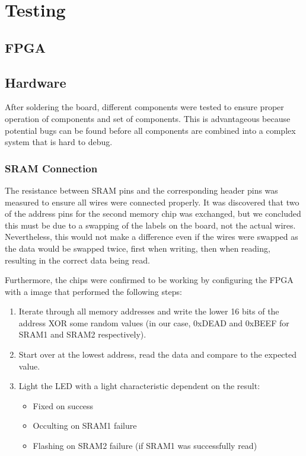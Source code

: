 \section{Testing}


\subsection{FPGA}


\subsection{Hardware}
After soldering the board, different components were tested to ensure proper operation of components and set of components.
This is advantageous because potential bugs can be found before all components are combined into a complex system that is hard to debug.

\subsubsection{SRAM Connection}
The resistance between SRAM pins and the corresponding header pins was measured to ensure all wires were connected properly.
It was discovered that two of the address pins for the second memory chip was exchanged, but we concluded this must be due to a swapping of the labels on the board, not the actual wires.
Nevertheless, this would not make a difference even if the wires were swapped as the data would be swapped twice, first when writing, then when reading, resulting in the correct data being read.

Furthermore, the chips were confirmed to be working by configuring the FPGA with a image that performed the following steps:
\begin{enumerate}
    \item Iterate through all memory addresses and write the lower 16 bits of the address XOR some random values (in our case, 0xDEAD and 0xBEEF for SRAM1 and SRAM2 respectively).
    \item Start over at the lowest address, read the data and compare to the expected value.
    \item Light the LED with a light characteristic dependent on the result:
        \begin{itemize}
            \item Fixed on success
            \item Occulting on SRAM1 failure
            \item Flashing on SRAM2 failure (if SRAM1 was successfully read)
        \end{itemize}
\end{enumerate}

